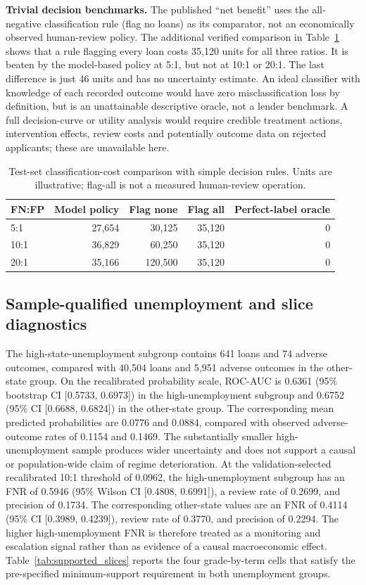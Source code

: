 \documentclass[10pt]{article}
\begin{document}
\noindent\textbf{Trivial decision benchmarks.} The published ``net benefit'' uses the all-negative classification rule (flag no loans) as its comparator, not an economically observed human-review policy. The additional verified comparison in Table~\ref{tab:r2_policy_benchmarks} shows that a rule flagging every loan costs 35,120 units for all three ratios. It is beaten by the model-based policy at 5:1, but not at 10:1 or 20:1. The last difference is just 46 units and has no uncertainty estimate. An ideal classifier with knowledge of each recorded outcome would have zero misclassification loss by definition, but is an unattainable descriptive oracle, not a lender benchmark. A full decision-curve or utility analysis would require credible treatment actions, intervention effects, review costs and potentially outcome data on rejected applicants; these are unavailable here.

\begin{table}[!ht]
\centering
\caption{Test-set classification-cost comparison with simple decision rules. Units are illustrative; flag-all is not a measured human-review operation.}
\label{tab:r2_policy_benchmarks}
\begin{tabular}{lrrrr}
\toprule
FN:FP & Model policy & Flag none & Flag all & Perfect-label oracle \\
\midrule
5:1 & 27,654 & 30,125 & 35,120 & 0 \\
10:1 & 36,829 & 60,250 & 35,120 & 0 \\
20:1 & 35,166 & 120,500 & 35,120 & 0 \\
\bottomrule
\end{tabular}
\end{table}

\subsection{Sample-qualified unemployment and slice diagnostics}
\label{sec:subgroup}

The high-state-unemployment subgroup contains 641 loans and 74 adverse outcomes, compared with 40,504 loans and 5,951 adverse outcomes in the other-state group. On the recalibrated probability scale, ROC-AUC is 0.6361 (95\% bootstrap CI [0.5733, 0.6973]) in the high-unemployment subgroup and 0.6752 (95\% CI [0.6688, 0.6824]) in the other-state group. The corresponding mean predicted probabilities are 0.0776 and 0.0884, compared with observed adverse-outcome rates of 0.1154 and 0.1469. The substantially smaller high-unemployment sample produces wider uncertainty and does not support a causal or population-wide claim of regime deterioration. At the validation-selected recalibrated 10:1 threshold of 0.0962, the high-unemployment subgroup has an FNR of 0.5946 (95\% Wilson CI [0.4808, 0.6991]), a review rate of 0.2699, and precision of 0.1734. The corresponding other-state values are an FNR of 0.4114 (95\% CI [0.3989, 0.4239]), review rate of 0.3770, and precision of 0.2294. The higher high-unemployment FNR is therefore treated as a monitoring and escalation signal rather than as evidence of a causal macroeconomic effect. Table~\ref{tab:supported_slices} reports the four grade-by-term cells that satisfy the pre-specified minimum-support requirement in both unemployment groups.
\end{document}
